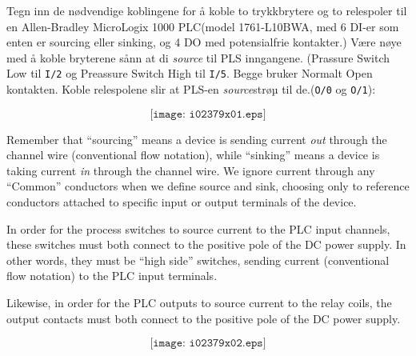 

Tegn inn de nødvendige koblingene for å koble to trykkbrytere og to relespoler til en Allen-Bradley MicroLogix 1000 PLC(model 1761-L10BWA, med 6 DI-er som enten er sourcing eller sinking, og 4 DO med potensialfrie kontakter.) Være nøye med å koble bryterene sånn at di \textit{source} til PLS inngangene. (Prassure Switch Low til \texttt{I/2} og Preassure Switch High til \texttt{I/5}. Begge bruker Normalt Open  kontakten. Koble relespolene slir at PLS-en \textit{source}strøµ til de.(\texttt{O/0} og \texttt{O/1}):


\vskip 50pt

$$\texttt{[image: i02379x01.eps]}$$

\vfil

\eject






Remember that ``sourcing'' means a device is sending current {\it out} through the channel wire (conventional flow notation), while ``sinking'' means a device is taking current {\it in} through the channel wire.  We ignore current through any ``Common'' conductors when we define source and sink, choosing only to reference conductors attached to specific input or output terminals of the device.

\vskip 10pt

In order for the process switches to source current to the PLC input channels, these switches must both connect to the positive pole of the DC power supply.  In other words, they must be ``high side'' switches, sending current (conventional flow notation) to the PLC input terminals.

\vskip 10pt

Likewise, in order for the PLC outputs to source current to the relay coils, the output contacts must both connect to the positive pole of the DC power supply.

$$\texttt{[image: i02379x02.eps]}$$












